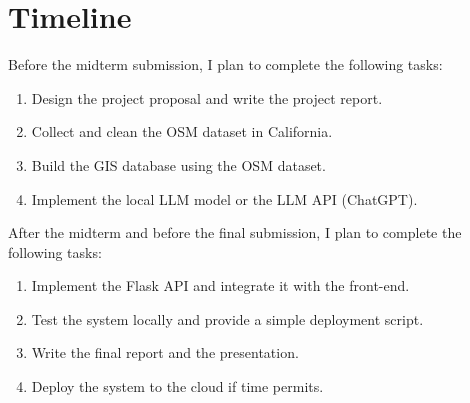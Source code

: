 \documentclass{article}
\begin{document}
\section{Timeline}

Before the midterm submission, I plan to complete the following tasks:

\begin{enumerate}
    \item Design the project proposal and write the project report.
    \item Collect and clean the OSM dataset in California.
    \item Build the GIS database using the OSM dataset.
    \item Implement the local LLM model or the LLM API (ChatGPT).
\end{enumerate}
After the midterm and before the final submission, I plan to complete the following tasks:

\begin{enumerate}
    \item Implement the Flask API and integrate it with the front-end.
    \item Test the system locally and provide a simple deployment script.
    \item Write the final report and the presentation.
    \item Deploy the system to the cloud if time permits.
\end{enumerate}

\end{document}
